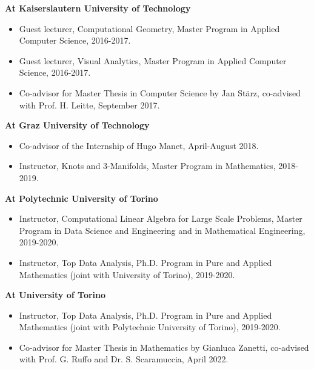 \documentclass[11pt]{article}
\begin{document}
\vspace*{1ex}
\noindent
{\bf At Kaiserslautern University of Technology}

\begin{itemize}
  \item Guest lecturer, Computational Geometry, Master Program in Applied Computer Science, 2016-2017.
  \item Guest lecturer, Visual Analytics, Master Program in Applied Computer Science, 2016-2017.
  \item Co-advisor for Master Thesis in Computer Science by Jan St\"{a}rz, co-advised with Prof. H. Leitte, September 2017.
\end{itemize}

\vspace*{1ex}
\noindent
{\bf At Graz University of Technology}

\begin{itemize}
  \item Co-advisor of the Internship of Hugo Manet, April-August 2018.
  \item Instructor, Knots and 3-Manifolds, Master Program in Mathematics, 2018-2019.
\end{itemize}

\vspace*{1ex}
\noindent
{\bf At Polytechnic University of Torino}

\begin{itemize}
  \item Instructor, Computational Linear Algebra for Large Scale Problems, Master Program in Data Science and Engineering and in Mathematical Engineering, 2019-2020.
  \item Instructor, Top Data Analysis, Ph.D. Program in Pure and Applied Mathematics (joint with University of Torino), 2019-2020.
\end{itemize}

\vspace*{1ex}
\noindent
{\bf At University of Torino}

\begin{itemize}
  \item Instructor, Top Data Analysis, Ph.D. Program in Pure and Applied Mathematics (joint with Polytechnic University of Torino), 2019-2020.
  \item Co-advisor for Master Thesis in Mathematics by Gianluca Zanetti, co-advised with Prof. G. Ruffo and Dr. S. Scaramuccia, April 2022.
\end{itemize}
\end{document}
